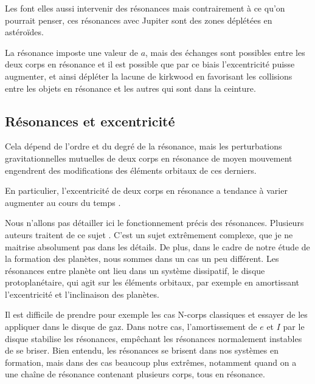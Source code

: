 \begin{remarque}
Les  font elles aussi intervenir des résonances mais contrairement à ce qu'on pourrait penser, ces résonances avec Jupiter sont des zones déplétées en astéroïdes. 

La résonance imposte une valeur de $a$, mais des échanges sont possibles entre les deux corps en résonance et il est possible que par ce biais l'excentricité puisse augmenter, et ainsi dépléter la lacune de kirkwood en favorisant les collisions entre les objets en résonance et les autres qui sont dans la ceinture.
\end{remarque}


\subsection{Résonances et excentricité}
Cela dépend de l'ordre et du degré de la résonance, mais les perturbations gravitationnelles mutuelles de deux corps en résonance de moyen mouvement engendrent des modifications des éléments orbitaux de ces derniers. 

En particulier, l'excentricité de deux corps en résonance a tendance à varier augmenter au cours du temps \citep[eq. (8.29)]{murray2000solar}. 

Nous n'allons pas détailler ici le fonctionnement précis des résonances. Plusieurs auteurs traitent de ce sujet \citep{greenberg1977orbit, peale1986orbital, malhotra1988phd}. C'est un sujet extrêmement complexe, que je ne maitrise absolument pas dans les détails. De plus, dans le cadre de notre étude de la formation des planètes, nous sommes dans un cas un peu différent. Les résonances entre planète ont lieu dans un système dissipatif, le disque protoplanétaire, qui agit sur les éléments orbitaux, par exemple en amortissant l'excentricité et l'inclinaison des planètes.

Il est difficile de prendre pour exemple les cas N-corps classiques et essayer de les appliquer dans le disque de gaz. Dans notre cas, l'amortissement de $e$ et $I$ par le disque stabilise les résonances, empêchant les résonances normalement instables de se briser. Bien entendu, les résonances se brisent dans nos systèmes en formation, mais dans des cas beaucoup plus extrêmes, notamment quand on a une chaîne de résonance contenant plusieurs corps, tous en résonance. 

